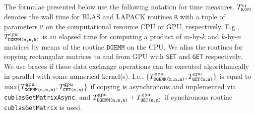 \documentclass{llncs}
\begin{document}
The formulae presented below use the following notation for time measures.
$T^{\rm cr}_{\texttt{R(P)}}$ denotes the wall time 
for BLAS and LAPACK routines {\tt R} with a tuple of parameters {\tt P}
on the computational resource CPU or GPU, respectively.
E.g., $T^{\rm cpu}_{\texttt{DGEMM(m,n,k)}}$ is an elapsed time for 
computing a product of $m$-by-$k$ and $k$-by-$n$ matrices
by means of the routine $\texttt{DGEMM}$ on the CPU.
We alias the routines for copying rectangular matrices to and from GPU 
with {\tt SET} and {\tt GET} respectively.
We use braces if 
these data exchange operations can be executed algorithmically 
in parallel with some numerical kernel(s).
I.e., $\{T_{\texttt{DGEMM(n,n,n)}}^{\rm gpu},T^{\rm gpu}_{\texttt{GET(n,n)}}\}$ 
is equal to 
$\max\{T_{\texttt{DGEMM(n,n,n)}}^{\rm gpu},T^{\rm gpu}_{\texttt{GET(n,n)}}\}$ 
if copying is asynchronous and implemented 
via {\tt cublasGetMatrixAsync}, 
and $T_{\texttt{DGEMM(n,n,n)}}^{\rm gpu}+T^{\rm gpu}_{\texttt{GET(n,n)}}$ 
if synchronous routine {\tt cublasGetMatrix} is used.
\end{document}
